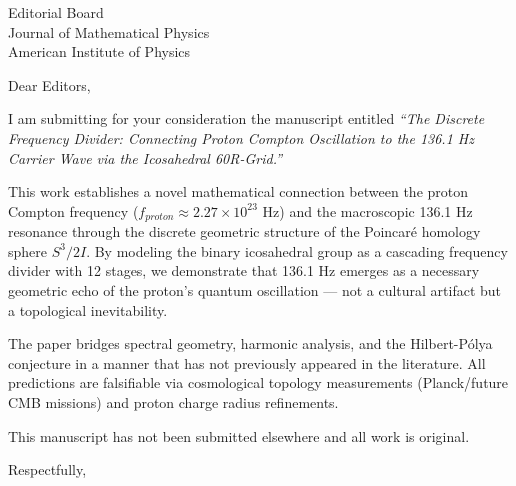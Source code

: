 \documentclass[11pt]{letter}
\begin{document}
\begin{letter}{Editorial Board \\ Journal of Mathematical Physics \\ American Institute of Physics}

\opening{Dear Editors,}

I am submitting for your consideration the manuscript entitled \emph{``The Discrete Frequency Divider: Connecting Proton Compton Oscillation to the 136.1 Hz Carrier Wave via the Icosahedral 60R-Grid.''}

This work establishes a novel mathematical connection between the proton Compton frequency ($f_{proton} \approx 2.27 \times 10^{23}$ Hz) and the macroscopic 136.1 Hz resonance through the discrete geometric structure of the Poincar\'{e} homology sphere $S^3/2I$. By modeling the binary icosahedral group as a cascading frequency divider with 12 stages, we demonstrate that 136.1 Hz emerges as a necessary geometric echo of the proton's quantum oscillation --- not a cultural artifact but a topological inevitability.

The paper bridges spectral geometry, harmonic analysis, and the Hilbert-P\'{o}lya conjecture in a manner that has not previously appeared in the literature. All predictions are falsifiable via cosmological topology measurements (Planck/future CMB missions) and proton charge radius refinements.

This manuscript has not been submitted elsewhere and all work is original.

\closing{Respectfully,}

\end{letter}
\end{document}
